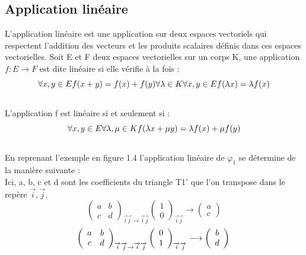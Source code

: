 \documentclass[a4paper, 12pt]{report}
\begin{document}
		\subsection{Application linéaire}
		L'application linéaire est une application sur deux espaces vectoriels qui respectent l'addition des vecteurs et les produits scalaires définis dans ces espaces vectorielles. Soit E et F deux espaces vectorielles sur un corps K, une application $ f : E \longrightarrow F $ est dite linéaire si elle vérifie à la fois : \\
		$$
		\forall x,y \in E  f(x+y) = f(x) + f(y)\\
		\vspace{0.2cm}
		\\
		\forall \lambda \in K  \forall x,y  \in E  f(\lambda x) = \lambda f(x)\\
		$$
		\\
		L'application f est linéaire si et seulement si :\\
		$$
		\forall x,y \in E \forall \lambda , \mu \in K  f(\lambda x + \mu y) = \lambda f(x) + \mu f(y)\\
		$$
		\\
		En reprenant l'exemple en figure 1.4 l'application linéaire de $\varphi_{1}$ se détermine de la manière suivante : \\
		Ici, a, b, c et d sont les coefficients du triangle T1' que l'on transpose dans le repère $\overrightarrow{i},\overrightarrow{j}$.
		$$
		\left(\begin{array}{cc}
		a & b \\
		c & d 
		\end{array}
		\right) _{\overrightarrow{i}\overrightarrow{j} \rightarrow \overrightarrow{i}\overrightarrow{j}}
		\left(\begin{array}{c}
		1 \\
		0 
		\end{array}
		\right) _{\overrightarrow{i}\overrightarrow{j}} 
		\longrightarrow
		\left(\begin{array}{c}
		a\\
		c
		\end{array}
		\right)
		$$
		$$
		\left(\begin{array}{cc}
		a & b \\
		c & d 
		\end{array}
		\right) _{\overrightarrow{i}\overrightarrow{j} \rightarrow \overrightarrow{i}\overrightarrow{j}}
		\left(\begin{array}{c}
		0 \\
		1 
		\end{array}
		\right) _{\overrightarrow{i}\overrightarrow{j}} 
		\longrightarrow
		\left(\begin{array}{c}
		b\\
		d
		\end{array}
		\right)
		\\
		$$
		
\end{document}
